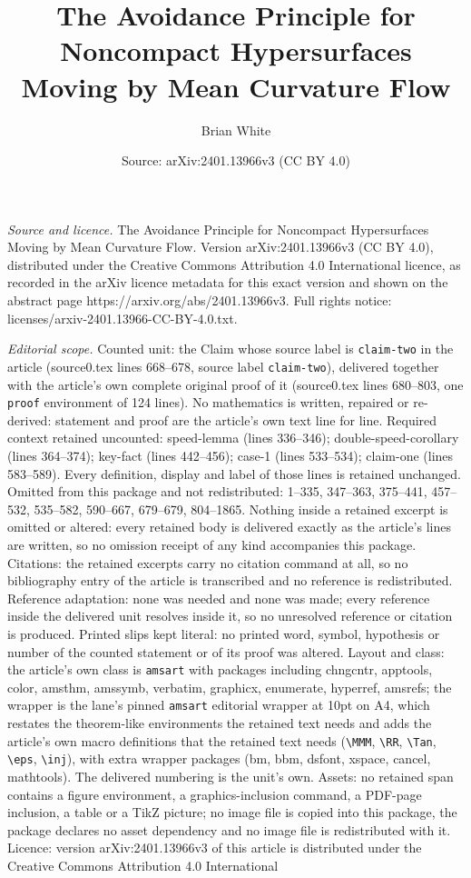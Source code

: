 \documentclass[10pt,a4paper]{amsart}
\title[The Avoidance Principle for Noncompact Hypersurfaces Moving ]{The Avoidance Principle for Noncompact Hypersurfaces Moving by Mean Curvature Flow}
\author{Brian White}
\date{Source: arXiv:2401.13966v3 (CC BY 4.0)}
\begin{document}
\maketitle

\noindent\emph{Source and licence.} The Avoidance Principle for Noncompact Hypersurfaces Moving by Mean Curvature Flow. Version arXiv:2401.13966v3 (CC BY 4.0), distributed under the Creative Commons Attribution 4.0 International licence, as recorded in the arXiv licence metadata for this exact version and shown on the abstract page https://arxiv.org/abs/2401.13966v3. Full rights notice: licenses/arxiv-2401.13966-CC-BY-4.0.txt.\par\smallskip

\noindent\textit{Editorial scope.} Counted unit: the Claim whose source label is \texttt{claim-two} in the article (source0.tex lines 668--678, source label \texttt{claim-two}), delivered together with the article's own complete original proof of it (source0.tex lines 680--803, one \texttt{proof} environment of 124 lines). No mathematics is written, repaired or re-derived: statement and proof are the article's own text line for line. Required context retained uncounted: speed-lemma (lines 336--346); double-speed-corollary (lines 364--374); key-fact (lines 442--456); case-1 (lines 533--534); claim-one (lines 583--589). Every definition, display and label of those lines is retained unchanged. Omitted from this package and not redistributed: 1--335, 347--363, 375--441, 457--532, 535--582, 590--667, 679--679, 804--1865. Nothing inside a retained excerpt is omitted or altered: every retained body is delivered exactly as the article's lines are written, so no omission receipt of any kind accompanies this package. Citations: the retained excerpts carry no citation command at all, so no bibliography entry of the article is transcribed and no reference is redistributed. Reference adaptation: none was needed and none was made; every reference inside the delivered unit resolves inside it, so no unresolved reference or citation is produced. Printed slips kept literal: no printed word, symbol, hypothesis or number of the counted statement or of its proof was altered. Layout and class: the article's own class is \texttt{amsart} with packages including chngcntr, apptools, color, amsthm, amssymb, verbatim, graphicx, enumerate, hyperref, amsrefs; the wrapper is the lane's pinned \texttt{amsart} editorial wrapper at 10pt on A4, which restates the theorem-like environments the retained text needs and adds the article's own macro definitions that the retained text needs (\texttt{\textbackslash MMM}, \texttt{\textbackslash RR}, \texttt{\textbackslash Tan}, \texttt{\textbackslash eps}, \texttt{\textbackslash inj}), with extra wrapper packages (bm, bbm, dsfont, xspace, cancel, mathtools). The delivered numbering is the unit's own. Assets: no retained span contains a figure environment, a graphics-inclusion command, a PDF-page inclusion, a table or a TikZ picture; no image file is copied into this package, the package declares no asset dependency and no image file is redistributed with it. Licence: version arXiv:2401.13966v3 of this article is distributed under the Creative Commons Attribution 4.0 International 
\end{document}
